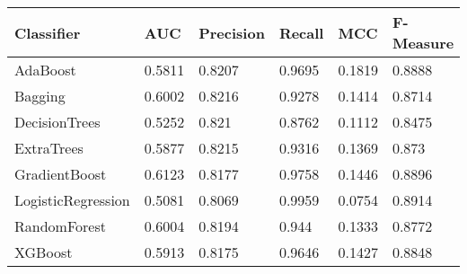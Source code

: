 \begin{tabular}{|p{3cm}p{1.2cm}p{1.2cm}p{1.2cm}p{1.2cm}p{1.5cm}|}
  \hline
Classifier & AUC & Precision & Recall & MCC & F-Measure \\ 
  \hline \hline
AdaBoost & 0.5811 & 0.8207 & 0.9695 & 0.1819 & 0.8888 \\ 
  Bagging & 0.6002 & 0.8216 & 0.9278 & 0.1414 & 0.8714 \\ 
  DecisionTrees & 0.5252 & 0.821 & 0.8762 & 0.1112 & 0.8475 \\ 
  ExtraTrees & 0.5877 & 0.8215 & 0.9316 & 0.1369 & 0.873 \\ 
  GradientBoost & 0.6123 & 0.8177 & 0.9758 & 0.1446 & 0.8896 \\ 
  LogisticRegression & 0.5081 & 0.8069 & 0.9959 & 0.0754 & 0.8914 \\ 
  RandomForest & 0.6004 & 0.8194 & 0.944 & 0.1333 & 0.8772 \\ 
  XGBoost & 0.5913 & 0.8175 & 0.9646 & 0.1427 & 0.8848 \\ 
   \hline
\end{tabular}
